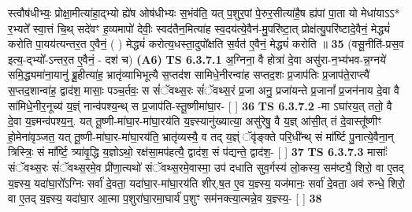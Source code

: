 \documentclass[17pt]{extarticle}
\begin{document}
                  स्त्वौष॑धीभ्यः॒ प्रोक्षा॒मीत्या॑हा॒द्भ्यो ह्ये॑ष ओष॑धीभ्यः स॒भंव॑ति॒ यत् प॒शुर॒पां पे॒रुर॒सीत्या॑है॒ष ह्य॑पां पा॒ता यो मेधा॑याऽऽ* र॒भ्यते᳚ स्वा॒त्तं चि॒थ् सदे॑वꣳ ह॒व्यमापो॑ देवीः॒ स्वद॑तैन॒मित्या॑ह स्व॒दय॑त्ये॒वैन॑-मु॒परि॑ष्टा॒त् प्रोक्ष॑त्यु॒परि॑ष्टादे॒वैनं॒ मेद्ध्यं॑ करोति पा॒यय॑त्यन्तर॒त ए॒वैनं॒ ( ) मेद्ध्यं॑ करोत्य॒धस्ता॒दुपो᳚क्षति स॒र्वत॑ ए॒वैनं॒ मेद्ध्यं॑ करोति ॥ \textbf{  35 } \newline
                  \newline
                      (वसू॒नीति॑-प्रस॒व इत्य॒-द्भ्यो᳚-ऽन्तर॒त ए॒वैनं॒ - दश॑ च)  \textbf{(A6)} \newline \newline
                                        \textbf{ TS 6.3.7.1} \newline
                  अ॒ग्निना॒ वै होत्रा॑ दे॒वा असु॑रा-न॒भ्य॑भव-न्न॒ग्नये॑ समि॒द्ध्यमा॑ना॒यानु॑ ब्रू॒हीत्या॑ह॒ भ्रातृ॑व्याभिभूत्यै स॒प्तद॑श सामिधे॒नीरन्वा॑ह सप्तद॒शः प्र॒जाप॑तिः प्र॒जाप॑ते॒राप्त्यै॑ स॒प्तद॒शान्वा॑ह॒ द्वाद॑श॒ मासाः॒ पञ्च॒र्तवः॒ स सं॑ॅवथ्स॒रः सं॑ॅवथ्स॒रं प्र॒जा अनु॒ प्रजा॑यन्ते प्र॒जानां᳚ प्र॒जन॑नाय दे॒वा वै सा॑मिधे॒नीर॒नूच्य॑ य॒ज्ञ्ं नान्व॑पश्य॒न्थ् स प्र॒जाप॑ति-स्तू॒ष्णीमा॑घा॒र- [  ] \textbf{  36} \newline
                  \newline
                                \textbf{ TS 6.3.7.2} \newline
                  -मा ऽघा॑रय॒त् ततो॒ वै दे॒वा य॒ज्ञ्मन्व॑पश्य॒न्॒. यत् तू॒ष्णी-मा॑घा॒र-मा॑घा॒रय॑ति य॒ज्ञ्स्यानु॑ख्यात्या॒ असु॑रेषु॒ वै य॒ज्ञ् आ॑सी॒त् तं दे॒वास्तू᳚ष्णीꣳ हो॒मेना॑वृञ्जत॒ यत् तू॒ष्णी-मा॑घा॒र-मा॑घा॒रय॑ति॒ भ्रातृ॑व्यस्यै॒ व तद् य॒ज्ञ्ं ॅवृ॑ङ्क्ते परि॒धी॑न्थ् सं मा᳚र्ष्टि पु॒नात्ये॒वैना॒न् त्रिस्त्रिः॒ सं मा᳚र्ष्टि॒ त्र्या॑वृ॒द्धि य॒ज्ञोऽथो॒ रक्ष॑सा॒मप॑हत्यै॒ द्वाद॑श॒ सं प॑द्यन्ते॒ द्वाद॑श॒- [  ] \textbf{  37} \newline
                  \newline
                                \textbf{ TS 6.3.7.3} \newline
                  मासाः᳚ संॅवथ्स॒रः सं॑ॅवथ्स॒रमे॒व प्री॑णा॒त्यथो॑ संॅवथ्स॒रमे॒वास्मा॒ उप॑ दधाति सुव॒र्गस्य॑ लो॒कस्य॒ सम॑ष्ट्यै॒ शिरो॒ वा ए॒तद् य॒ज्ञ्स्य॒ यदा॑घा॒रो᳚ऽग्निः सर्वा॑ दे॒वता॒ यदा॑घा॒र-मा॑घा॒रय॑ति शीर्.ष॒त ए॒व य॒ज्ञ्स्य॒ यज॑मानः॒ सर्वा॑ दे॒वता॒ अव॑ रुन्धे॒ शिरो॒ वा ए॒तद् य॒ज्ञ्स्य॒ यदा॑घा॒र आ॒त्मा प॒शुरा॑घा॒रमा॒घार्य॑ प॒शुꣳ सम॑नक्त्या॒त्मन्ने॒व य॒ज्ञ्स्य॒- [  ] \textbf{  38} \newline
                  \newline
\end{document}
